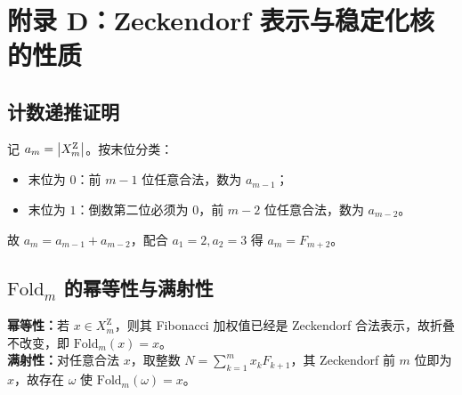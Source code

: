 \section{附录 D：Zeckendorf 表示与稳定化核的性质}
\label{app:zeckendorf-fold}

\subsection{计数递推证明}

记 $a_m=\left\lvert X_m^{\mathrm Z}\right\rvert$。按末位分类：
\begin{itemize}
  \item 末位为 $0$：前 $m-1$ 位任意合法，数为 $a_{m-1}$；
  \item 末位为 $1$：倒数第二位必须为 $0$，前 $m-2$ 位任意合法，数为 $a_{m-2}$。
\end{itemize}
故 $a_m=a_{m-1}+a_{m-2}$，配合 $a_1=2,a_2=3$ 得 $a_m=F_{m+2}$。

\subsection{\texorpdfstring{$\mathrm{Fold}_m$}{Fold\_m} 的幂等性与满射性}

\textbf{幂等性：}若 $x\in X_m^{\mathrm Z}$，则其 Fibonacci 加权值已经是 Zeckendorf 合法表示，故折叠不改变，即 $\mathrm{Fold}_m(x)=x$。\\
\textbf{满射性：}对任意合法 $x$，取整数 $N=\sum_{k=1}^m x_k F_{k+1}$，其 Zeckendorf 前 $m$ 位即为 $x$，故存在 $\omega$ 使 $\mathrm{Fold}_m(\omega)=x$。

